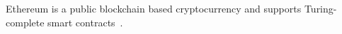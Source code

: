 
Ethereum is a public blockchain based cryptocurrency and supports Turing-complete smart contracts~\cite{ethereum}.

